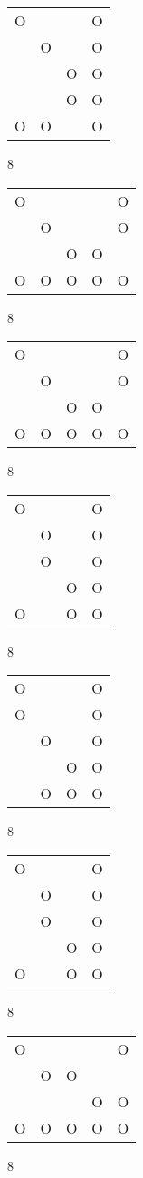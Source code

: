 \begin{tabular}{|m{0.2cm}m{0.2cm}m{0.2cm}m{0.2cm}|}\hline
O& & &O\\
 &O& &O\\
 & &O&O\\
 & &O&O\\
O&O& &O\\
\hline\end{tabular}8
\begin{tabular}{|m{0.2cm}m{0.2cm}m{0.2cm}m{0.2cm}m{0.2cm}|}\hline
O& & & &O\\
 &O& & &O\\
 & &O&O& \\
O&O&O&O&O\\
\hline\end{tabular}8
\begin{tabular}{|m{0.2cm}m{0.2cm}m{0.2cm}m{0.2cm}m{0.2cm}|}\hline
O& & & &O\\
 &O& & &O\\
 & &O&O& \\
O&O&O&O&O\\
\hline\end{tabular}8
\begin{tabular}{|m{0.2cm}m{0.2cm}m{0.2cm}m{0.2cm}|}\hline
O& & &O\\
 &O& &O\\
 &O& &O\\
 & &O&O\\
O& &O&O\\
\hline\end{tabular}8
\begin{tabular}{|m{0.2cm}m{0.2cm}m{0.2cm}m{0.2cm}|}\hline
O& & &O\\
O& & &O\\
 &O& &O\\
 & &O&O\\
 &O&O&O\\
\hline\end{tabular}8
\begin{tabular}{|m{0.2cm}m{0.2cm}m{0.2cm}m{0.2cm}|}\hline
O& & &O\\
 &O& &O\\
 &O& &O\\
 & &O&O\\
O& &O&O\\
\hline\end{tabular}8
\begin{tabular}{|m{0.2cm}m{0.2cm}m{0.2cm}m{0.2cm}m{0.2cm}|}\hline
O& & & &O\\
 &O&O& & \\
 & & &O&O\\
O&O&O&O&O\\
\hline\end{tabular}8
